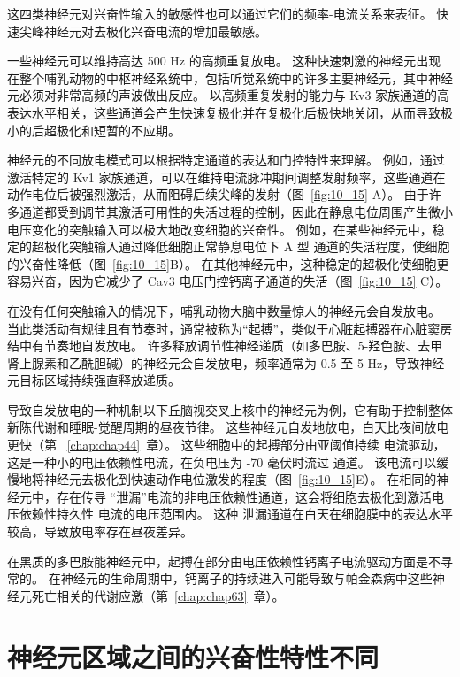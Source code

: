 这四类神经元对兴奋性输入的敏感性也可以通过它们的频率-电流关系来表征。
快速尖峰神经元对去极化兴奋电流的增加最敏感。


一些神经元可以维持高达 500 Hz 的高频重复放电。
这种快速刺激的神经元出现在整个哺乳动物的中枢神经系统中，包括听觉系统中的许多主要神经元，其中神经元必须对非常高频的声波做出反应。
以高频重复发射的能力与 Kv3 家族通道的高表达水平相关，这些通道会产生快速复极化并在复极化后极快地关闭，从而导致极小的后超极化和短暂的不应期。


神经元的不同放电模式可以根据特定通道的表达和门控特性来理解。
例如，通过激活特定的 Kv1 家族通道，可以在维持电流脉冲期间调整发射频率，这些通道在动作电位后被强烈激活，从而阻碍后续尖峰的发射（图~\ref{fig:10_15} A）。
由于许多通道都受到调节其激活可用性的失活过程的控制，因此在静息电位周围产生微小电压变化的突触输入可以极大地改变细胞的兴奋性。
例如，在某些神经元中，稳定的超极化突触输入通过降低细胞正常静息电位下 A 型  通道的失活程度，使细胞的兴奋性降低（图~\ref{fig:10_15}B）。 
在其他神经元中，这种稳定的超极化使细胞更容易兴奋，因为它减少了 Cav3 电压门控钙离子通道的失活（图~\ref{fig:10_15} C）。


在没有任何突触输入的情况下，哺乳动物大脑中数量惊人的神经元会自发放电。
当此类活动有规律且有节奏时，通常被称为“起搏”，类似于心脏起搏器在心脏窦房结中有节奏地自发放电。
许多释放调节性神经递质（如多巴胺、5-羟色胺、去甲肾上腺素和乙酰胆碱）的神经元会自发放电，频率通常为 0.5 至 5 Hz，导致神经元目标区域持续强直释放递质。


导致自发放电的一种机制以下丘脑视交叉上核中的神经元为例，它有助于控制整体新陈代谢和睡眠-觉醒周期的昼夜节律。
这些神经元自发地放电，白天比夜间放电更快（第 ~\ref{chap:chap44}~章）。 
这些细胞中的起搏部分由亚阈值持续  电流驱动，这是一种小的电压依赖性电流，在负电压为 -70 毫伏时流过  通道。
该电流可以缓慢地将神经元去极化到快速动作电位激发的程度（图~\ref{fig:10_15}E）。
在相同的神经元中，存在传导 “泄漏”电流的非电压依赖性通道，这会将细胞去极化到激活电压依赖性持久性  电流的电压范围内。
这种  泄漏通道在白天在细胞膜中的表达水平较高，导致放电率存在昼夜差异。


在黑质的多巴胺能神经元中，起搏在部分由电压依赖性钙离子电流驱动方面是不寻常的。
在神经元的生命周期中，钙离子的持续进入可能导致与帕金森病中这些神经元死亡相关的代谢应激（第~\ref{chap:chap63}~章）。



\section{神经元区域之间的兴奋性特性不同}

